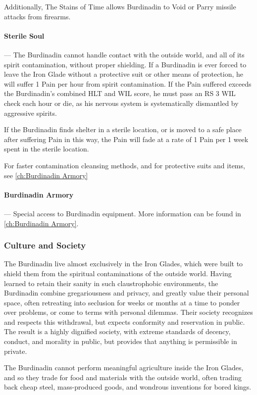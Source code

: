 \documentclass[oneside,11pt,english]{book}
\begin{document}
Additionally, The Stains of Time allows Burdinadin to Void or Parry missile attacks from firearms. 

\paragraph{Sterile Soul}---\quad
The Burdinadin cannot handle contact with the outside world, and all of its spirit contamination, 
without proper shielding. If a Burdinadin is ever forced to leave the Iron Glade without a 
protective suit or other means of protection, he will suffer 1 Pain per hour from spirit 
contamination. If the Pain suffered exceeds the Burdinadin's combined HLT and WIL score, he 
must pass an RS 3 WIL check each hour or die, as his nervous system is systematically 
dismantled by aggressive spirits. 

If the Burdinadin finds shelter in a sterile location, or is moved to a safe place after suffering Pain 
in this way, the Pain will fade at a rate of 1 Pain per 1 week spent in the sterile location.

For faster contamination cleansing methods, and for protective suits and items, see \autoref{ch:Burdinadin Armory}

\paragraph{Burdinadin Armory}---\quad
Special access to Burdinadin equipment. More information can be found in \autoref{ch:Burdinadin Armory}.


\subsubsection*{Culture and Society} 
The Burdinadin live almost exclusively in the Iron Glades, which were built to shield them from the 
spiritual contaminations of the outside world. Having learned to retain their sanity in such claustrophobic 
environments, the Burdinadin combine gregariousness and privacy, and greatly value their personal 
space, often retreating into seclusion for weeks or months at a time to ponder over problems, or come to 
terms with personal dilemmas. Their society recognizes and respects this withdrawal, but expects 
conformity and reservation in public. The result is a highly dignified society, with extreme standards of 
decency, conduct, and morality in public, but provides that anything is permissible in private. 

The Burdinadin cannot perform meaningful agriculture inside the Iron Glades, and so they trade for food 
and materials with the outside world, often trading back cheap steel, mass-produced goods, and wondrous 
inventions for bored kings. 
\end{document}
